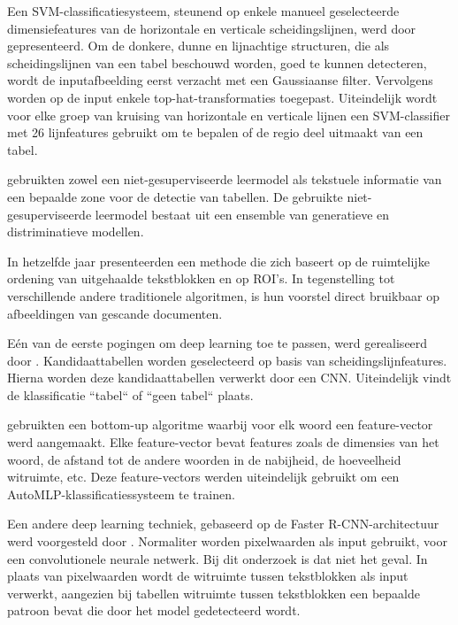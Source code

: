 Een \Gls{SVM}-classificatiesysteem, steunend op enkele manueel geselecteerde dimensiefeatures van de horizontale en verticale scheidingslijnen, werd door \textcite{Kasar2013} gepresenteerd. Om de donkere, dunne en lijnachtige structuren, die als scheidingslijnen van een tabel beschouwd worden, goed te kunnen detecteren, wordt de inputafbeelding eerst verzacht met een Gaussiaanse filter. Vervolgens worden op de input enkele top-hat-transformaties toegepast. Uiteindelijk wordt voor elke groep van kruising van horizontale en verticale lijnen een \Gls{SVM}-classifier met 26 lijnfeatures gebruikt om te bepalen of de regio deel uitmaakt van een tabel.

\textcite{Fan2015} gebruikten zowel een niet-gesuperviseerde leermodel als tekstuele informatie van een bepaalde zone voor de detectie van tabellen. De gebruikte niet-gesuperviseerde leermodel bestaat uit een ensemble van generatieve en distriminatieve modellen.

In hetzelfde jaar presenteerden \textcite{Tran2015} een methode die zich baseert op de ruimtelijke ordening van uitgehaalde tekstblokken en op \Gls{ROI}'s. In tegenstelling tot verschillende andere traditionele algoritmen, is hun voorstel direct bruikbaar op afbeeldingen van gescande documenten.

Eén van de eerste pogingen om deep learning toe te passen, werd gerealiseerd door \textcite{Hao2016}. Kandidaattabellen worden geselecteerd op basis van scheidingslijnfeatures. Hierna worden deze kandidaattabellen verwerkt door een \Gls{CNN}. Uiteindelijk vindt de klassificatie ``tabel`` of ``geen tabel`` plaats.

\textcite{Rashid2017} gebruikten een bottom-up algoritme waarbij voor elk woord een feature-vector werd aangemaakt. Elke feature-vector bevat features zoals de dimensies van het woord, de afstand tot de andere woorden in de nabijheid, de hoeveelheid witruimte, etc. Deze feature-vectors werden uiteindelijk gebruikt om een AutoMLP-klassificatiessysteem te trainen.

Een andere deep learning techniek, gebaseerd op de Faster R-CNN-architectuur werd voorgesteld door \textcite{Gilani2017}. Normaliter worden pixelwaarden als input gebruikt, voor een convolutionele neurale netwerk. Bij dit onderzoek is dat niet het geval. In plaats van pixelwaarden wordt de witruimte tussen tekstblokken als input verwerkt, aangezien bij tabellen witruimte tussen tekstblokken een bepaalde patroon bevat die door het model gedetecteerd wordt.

